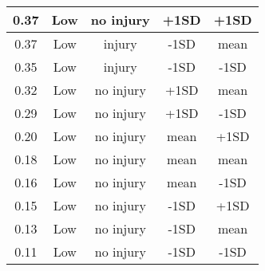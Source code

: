 \documentclass[
]{article}
\begin{document}
\begin{table}[H]
\begin{tabular}{c|c|c|c|c}
\hline
0.37 & Low & no injury & +1SD & +1SD\\
\hline
0.37 & Low & injury & -1SD & mean\\
\hline
0.35 & Low & injury & -1SD & -1SD\\
\hline
0.32 & Low & no injury & +1SD & mean\\
\hline
0.29 & Low & no injury & +1SD & -1SD\\
\hline
0.20 & Low & no injury & mean & +1SD\\
\hline
0.18 & Low & no injury & mean & mean\\
\hline
0.16 & Low & no injury & mean & -1SD\\
\hline
0.15 & Low & no injury & -1SD & +1SD\\
\hline
0.13 & Low & no injury & -1SD & mean\\
\hline
0.11 & Low & no injury & -1SD & -1SD\\
\hline
\end{tabular}
\end{table}
\end{document}
